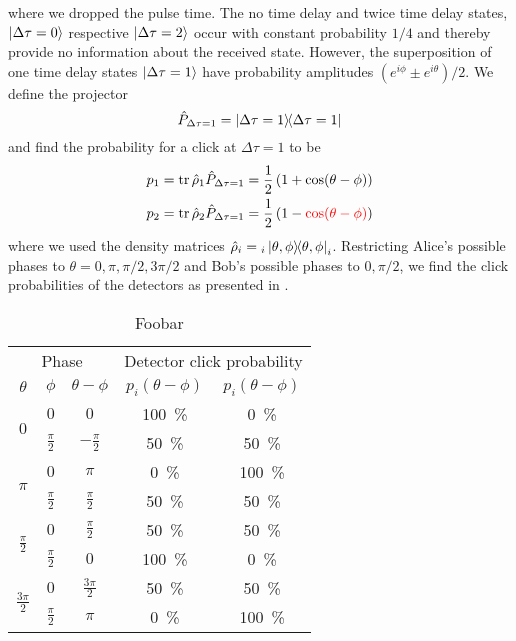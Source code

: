 where we dropped the pulse time.
The no time delay and twice time delay states, $\ket{\Delta\tau=0}$ respective $\ket{\Delta\tau=2}$ occur with constant probability $1/4$ and thereby provide no information about the received state.
However, the superposition of one time delay states $\ket{\Delta\tau=1}$ have probability amplitudes $(e^{i\phi}\pm e^{i\theta})/2$.
We define the projector
\begin{equation}
	\hat{P}_{\Delta\tau=1}
	=
	\ketbra{\Delta\tau=1}
\end{equation}
and find the probability for a click at $\Delta\tau=1$ to be
\begin{align}
	p_1
	&=
	\trace{\hat\rho_1\hat{P}_{\Delta\tau=1}}
	=
	\frac{1}{2}
	\left(1+\cos(\theta-\phi)\right)
	\\
	p_2
	&=
	\trace{\hat\rho_2\hat{P}_{\Delta\tau=1}}
	=
	\frac{1}{2}
	\left(1-\textcolor{red}{\cos(\theta-\phi)}\right)
\end{align}
where we used the density matrices $\hat\rho_i={}_i\ketbra{\theta,\phi}_i$.
Restricting Alice's possible phases to $\theta=0,\pi,\pi/2,3\pi/2$ and Bob's possible phases to $0,\pi/2$, we find the click probabilities of the detectors as presented in .
\begin{table}[htb]
	\centering
	\begin{tabular}{ccccc}
		\toprule
		\multicolumn{3}{c}{Phase} & \multicolumn{2}{c}{Detector click probability} \\
		\cmidrule{1-3}
		\cmidrule{4-5}
		$\theta$ & $\phi$ & $\theta-\phi$ & $p_i(\theta-\phi)$ & $p_i(\theta-\phi)$ \\
		\midrule
		\multirow{2}{*}{$0$} & $0$ & $0$ & \SI{100}{\percent} & \SI{0}{\percent} \\
		& $\frac{\pi}{2}$ & $-\frac{\pi}{2}$ & \SI{50}{\percent} & \SI{50}{\percent} \\
		\cmidrule{1-3}
		\multirow{2}{*}{$\pi$} & $0$ & $\pi$ & \SI{0}{\percent} & \SI{100}{\percent} \\
		& $\frac{\pi}{2}$ & $\frac{\pi}{2}$ & \SI{50}{\percent} & \SI{50}{\percent} \\
		\cmidrule{1-3}
		\multirow{2}{*}{$\frac{\pi}{2}$} & $0$ & $\frac{\pi}{2}$ & \SI{50}{\percent} & \SI{50}{\percent} \\
		& $\frac{\pi}{2}$ & $0$ & \SI{100}{\percent} & \SI{0}{\percent} \\
		\cmidrule{1-3}
		\multirow{2}{*}{$\frac{3\pi}{2}$} & $0$ & $\frac{3\pi}{2}$ & \SI{50}{\percent} & \SI{50}{\percent} \\
		& $\frac{\pi}{2}$ & $\pi$ & \SI{0}{\percent} & \SI{100}{\percent} \\
		\bottomrule
	\end{tabular}
	\caption{Foobar}\label{tab:tp_bb84_probabilities}
\end{table}